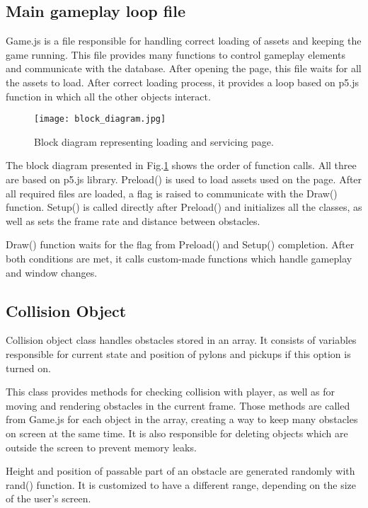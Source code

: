 \documentclass[oneside,a4paper,11pt]{report}
\begin{document}
\subsection{Main gameplay loop file}
Game.js is a file responsible for handling correct loading of assets and keeping the game running. This file provides many functions to control gameplay elements and communicate with the database. After opening the page, this file waits for all the assets to load. After correct loading process, it provides a loop based on p5.js function in which all the other objects interact.

\begin{figure}
	\centering
	\texttt{[image: block\_diagram.jpg]}
	\caption{Block diagram representing loading and servicing page.\label{fig:block_diagram}}
\end{figure}

\par
The block diagram presented in Fig.\ref{fig:block_diagram} shows the order of function calls. All three are based on p5.js library. Preload() is used to load assets used on the page. After all required files are loaded, a flag is raised to communicate with the Draw() function. Setup() is called directly after Preload() and initializes all the classes, as well as sets the frame rate and distance between obstacles.

\par
Draw() function waits for the flag from Preload() and Setup() completion. After both conditions are met, it calls custom-made functions which handle gameplay and window changes.

\subsection{Collision Object}

Collision object class handles obstacles stored in an array. It consists of variables responsible for current state and position of pylons and pickups if this option is turned on.

\par
This class provides methods for checking collision with player, as well as for moving and rendering obstacles in the current frame. Those methods are called from Game.js for each object in the array, creating a way to keep many obstacles on screen at the same time. It is also responsible for deleting objects which are outside the screen to prevent memory leaks.

\par
Height and position of passable part of an obstacle are generated randomly with rand() function. It is customized to have a different range, depending on the size of the user's screen.
\end{document}
